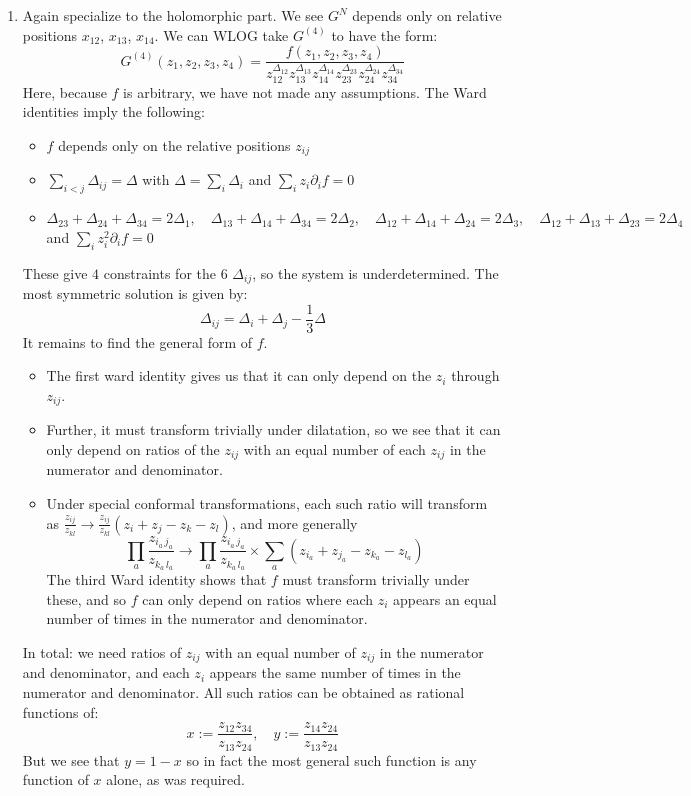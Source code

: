 \documentclass[11pt]{article}
\begin{document}
\begin{enumerate}
	\item Again specialize to the holomorphic part. We see $G^N$ depends only on relative positions $x_{12}$, $x_{13}$, $x_{14}$. We can WLOG take $G^{(4)}$ to have the form:
	\[
		G^{(4)}(z_1, z_2, z_3, z_4) = \frac{f(z_1, z_2, z_3, z_4)}{z_{12}^{\Delta_{12}} z_{13}^{\Delta_{13}} z_{14}^{\Delta_{14}} z_{23}^{\Delta_{23}} z_{24}^{\Delta_{24}} z_{34}^{\Delta_{34}}}
	\]
	Here, because $f$ is arbitrary, we have not made any assumptions. The Ward identities imply the following:
	\begin{itemize}
		\item $f$ depends only on the relative positions $z_{ij}$
		\item $\sum_{i<j} \Delta_{ij} = \Delta$ with $\Delta = \sum_{i} \Delta_i$ and $\sum_i z_i \partial_i f = 0$
		\item $\Delta_{23} + \Delta_{24} + \Delta_{34} = 2 \Delta_1,\quad  \Delta_{13} + \Delta_{14} + \Delta_{34} = 2 \Delta_2, \quad \Delta_{12} + \Delta_{14} + \Delta_{24} = 2 \Delta_3, \quad \Delta_{12} + \Delta_{13} + \Delta_{23} = 2 \Delta_4$ and $\sum_i z_i^2 \partial_i f = 0$
	\end{itemize}
	These give $4$ constraints for the $6$ $\Delta_{ij}$, so the system is underdetermined. The most symmetric solution is given by:
	\[
		\Delta_{ij} = \Delta_i + \Delta_j - \frac13 \Delta
	\]
	It remains to find the general form of $f$.
	\begin{itemize}
		\item The first ward identity gives us that it can only depend on the $z_i$ through $z_{ij}$.
		\item Further, it must transform trivially under dilatation, so we see that it can only depend on ratios of the $z_{ij}$ with an equal number of each $z_{ij}$ in the numerator and denominator. 
		\item Under special conformal transformations, each such ratio will transform as $\frac{z_{ij}}{z_{kl}} \to \frac{z_{ij}}{z_{kl}} (z_i + z_j - z_k - z_l)$, and more generally
		\[
			\prod_a \frac{z_{i_a \, j_a}}{z_{k_a\, l_a}} \to \prod_a \frac{z_{i_a \, j_a}}{z_{k_a\, l_a}} \times \sum_{a} (z_{i_a} + z_{j_a} - z_{k_a} - z_{l_a})
		\]
		 The third Ward identity shows that $f$ must transform trivially under these, and so $f$ can only depend on ratios where each $z_i$ appears an equal number of times in the numerator and denominator. 
	\end{itemize}
	In total: we need ratios of $z_{ij}$ with an equal number of $z_{ij}$ in the numerator and denominator, and each $z_i$ appears the same number of times in the numerator and denominator. All such ratios can be obtained as rational functions of:
	\[
		x := \frac{z_{12} z_{34}}{z_{13} z_{24}}, \quad y := \frac{z_{14} z_{24}}{z_{13} z_{24}}
	\]
	But we see that $y = 1-x$ so in fact the most general such function is any function of $x$ alone, as was required. 
	

\end{enumerate}
\end{document}
